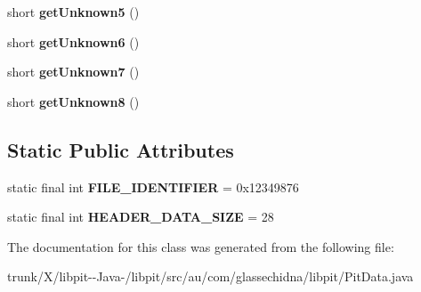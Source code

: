 \begin{DoxyCompactItemize}
\item 
\hypertarget{classau_1_1com_1_1glassechidna_1_1libpit_1_1PitData_a53f910355968540ead83fb647b51d2a6}{short {\bfseries get\-Unknown5} ()}\label{classau_1_1com_1_1glassechidna_1_1libpit_1_1PitData_a53f910355968540ead83fb647b51d2a6}

\item 
\hypertarget{classau_1_1com_1_1glassechidna_1_1libpit_1_1PitData_a82e5cb2fbb0b6ddf49074812ecbd5cca}{short {\bfseries get\-Unknown6} ()}\label{classau_1_1com_1_1glassechidna_1_1libpit_1_1PitData_a82e5cb2fbb0b6ddf49074812ecbd5cca}

\item 
\hypertarget{classau_1_1com_1_1glassechidna_1_1libpit_1_1PitData_ae4a1fe3dc0c1bb0db60d998457176278}{short {\bfseries get\-Unknown7} ()}\label{classau_1_1com_1_1glassechidna_1_1libpit_1_1PitData_ae4a1fe3dc0c1bb0db60d998457176278}

\item 
\hypertarget{classau_1_1com_1_1glassechidna_1_1libpit_1_1PitData_ab37730e14100028ebb8ba53ec621fc81}{short {\bfseries get\-Unknown8} ()}\label{classau_1_1com_1_1glassechidna_1_1libpit_1_1PitData_ab37730e14100028ebb8ba53ec621fc81}

\end{DoxyCompactItemize}
\subsection*{Static Public Attributes}
\begin{DoxyCompactItemize}
\item 
\hypertarget{classau_1_1com_1_1glassechidna_1_1libpit_1_1PitData_a6e6aaf481b0632c78ac10f6bf4e5157b}{static final int {\bfseries F\-I\-L\-E\-\_\-\-I\-D\-E\-N\-T\-I\-F\-I\-E\-R} = 0x12349876}\label{classau_1_1com_1_1glassechidna_1_1libpit_1_1PitData_a6e6aaf481b0632c78ac10f6bf4e5157b}

\item 
\hypertarget{classau_1_1com_1_1glassechidna_1_1libpit_1_1PitData_ac33a7f8b3f41f0cd97c9d5cafd9662a0}{static final int {\bfseries H\-E\-A\-D\-E\-R\-\_\-\-D\-A\-T\-A\-\_\-\-S\-I\-Z\-E} = 28}\label{classau_1_1com_1_1glassechidna_1_1libpit_1_1PitData_ac33a7f8b3f41f0cd97c9d5cafd9662a0}

\end{DoxyCompactItemize}


The documentation for this class was generated from the following file\-:\begin{DoxyCompactItemize}
\item 
trunk/\-X/libpit-\/-\/\-Java-\//libpit/src/au/com/glassechidna/libpit/Pit\-Data.\-java\end{DoxyCompactItemize}

